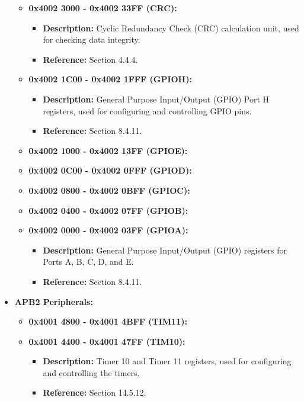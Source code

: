 \documentclass{article}
\begin{document}
\begin{itemize}
\begin{itemize}
        \item \textbf{0x4002 3000 - 0x4002 33FF (CRC):} 
        \begin{itemize}
            \item \textbf{Description:} Cyclic Redundancy Check (CRC) calculation unit, used for checking data integrity.
            \item \textbf{Reference:} Section 4.4.4.
        \end{itemize}
        
        \item \textbf{0x4002 1C00 - 0x4002 1FFF (GPIOH):} 
        \begin{itemize}
            \item \textbf{Description:} General Purpose Input/Output (GPIO) Port H registers, used for configuring and controlling GPIO pins.
            \item \textbf{Reference:} Section 8.4.11.
        \end{itemize}
        
        \item \textbf{0x4002 1000 - 0x4002 13FF (GPIOE):}
        \item \textbf{0x4002 0C00 - 0x4002 0FFF (GPIOD):}
        \item \textbf{0x4002 0800 - 0x4002 0BFF (GPIOC):}
        \item \textbf{0x4002 0400 - 0x4002 07FF (GPIOB):}
        \item \textbf{0x4002 0000 - 0x4002 03FF (GPIOA):}
        \begin{itemize}
            \item \textbf{Description:} General Purpose Input/Output (GPIO) registers for Ports A, B, C, D, and E.
            \item \textbf{Reference:} Section 8.4.11.
        \end{itemize}
    \end{itemize}
    
    \item \textbf{APB2 Peripherals:}
    \begin{itemize}
        \item \textbf{0x4001 4800 - 0x4001 4BFF (TIM11):}
        \item \textbf{0x4001 4400 - 0x4001 47FF (TIM10):} 
        \begin{itemize}
            \item \textbf{Description:} Timer 10 and Timer 11 registers, used for configuring and controlling the timers.
            \item \textbf{Reference:} Section 14.5.12.
        \end{itemize}
        

\end{itemize}
\end{itemize}
\end{document}
